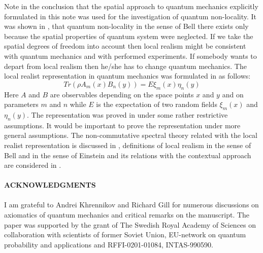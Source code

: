 \documentclass[12pt]{article}
\begin{document}
Note in the conclusion that the spatial approach to quantum
mechanics explicitly formulated in this note was used for the
investigation of quantum non-locality. It was shown in
\cite{Vol},\cite{Vol2} that quantum non-locality in the sense of
Bell there exists only because the spatial properties of quantum
system were neglected. If we take the spatial degrees of freedom
into account then local realism might be consistent with quantum
mechanics and with performed experiments. If somebody wants to
depart from local realism then he/she has to change quantum
mechanics. The local realist representation in quantum mechanics
was formulated in \cite{Vol2} as follows:
$$
Tr(\rho A_m(x)B_n(y))=E\xi_m(x)\eta_n(y)
$$
Here $A$ and $B$ are observables depending on the space points $x$
and $y$ and on  parameters $m$ and $n$ while $E$ is the
expectation of two random fields $\xi_m(x)$ and $\eta_n(y)$. The
representation was proved in \cite{Vol2} under some rather
restrictive assumptions. It would be important to prove the
representation under more general assumptions. The non-commutative
spectral theory related with the local realist representation is
discussed in \cite{Vol2}, definitions of   local realism in the
sense of Bell and in the sense of Einstein and its relations with
the contextual approach are considered in \cite{KhV}.
\\~\\
{ \bf ACKNOWLEDGMENTS}
\\~\\
I am grateful to Andrei Khrennikov and Richard Gill for numerous
discussions on axiomatics of quantum mechanics and critical
remarks on the manuscript.
 The paper was
supported by the grant of The Swedish Royal Academy of Sciences on
collaboration with scientists of former Soviet Union, EU-network
on quantum probability and applications and RFFI-0201-01084,
INTAS-990590.
\end{document}

